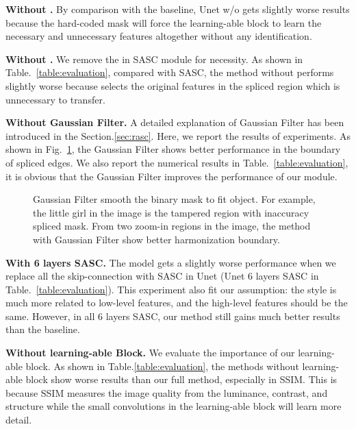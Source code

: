 \textbf{Without .} {By comparison with the baseline, Unet w/o  gets slightly worse results because the hard-coded mask will force the learning-able block  to learn the necessary and unnecessary features altogether without any identification.}




\textbf{Without .} We remove the  in SASC module for necessity. As shown in Table.~\ref{table:evaluation}, compared with SASC, the method without  performs slightly worse because  selects the original features in the spliced region which is unnecessary to transfer.


\textbf{Without Gaussian Filter.} A detailed explanation of Gaussian Filter has been introduced in the Section.\ref{sec:rasc}. Here, we report the results of experiments. As shown in Fig.~\ref{fig:gaussian}, the Gaussian Filter shows better performance in the boundary of spliced edges. We also report the numerical results in Table.~\ref{table:evaluation}, it is obvious that the Gaussian Filter improves the performance of our module.

\begin{figure}[h!]
\centering     {}
\caption{Gaussian Filter smooth the binary mask to fit object. For example, the little girl in the image is the tampered region with inaccuracy spliced mask. From two zoom-in regions in the image, the method with Gaussian Filter show better harmonization boundary.}
\label{fig:gaussian}
\vspace{-1.5em}
\end{figure}


\textbf{With 6 layers SASC.} The model gets a slightly worse performance when we  replace all the skip-connection with SASC in Unet (Unet  6 layers SASC in Table.~\ref{table:evaluation}). This experiment also fit our assumption: the style is much more related to low-level features, and the high-level features should be the same. However, in all 6 layers SASC, our method still gains much better results than the baseline. 




\textbf{Without learning-able Block.} We evaluate the importance of our learning-able block. As shown in Table.\ref{table:evaluation}, the methods without learning-able block  show worse results than our full method, especially in SSIM. This is because SSIM measures the image quality from the luminance, contrast, and structure while the small convolutions in the learning-able block will learn more detail. 



